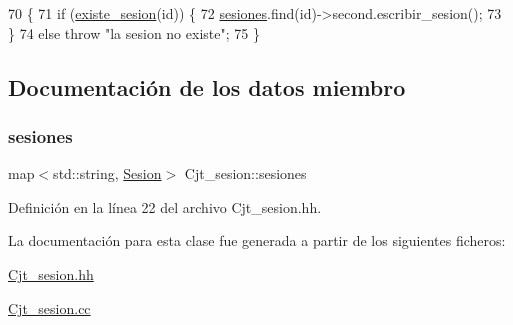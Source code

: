 \begin{DoxyCode}
70                                         \{
71     \textcolor{keywordflow}{if} (\mbox{\hyperlink{class_cjt__sesion_a405ed3806e378d1a415588e640584bbd}{existe\_sesion}}(\textcolor{keywordtype}{id})) \{
72       \mbox{\hyperlink{class_cjt__sesion_abac1c2ee3cccc598a8274c7da869aa9b}{sesiones}}.find(\textcolor{keywordtype}{id})->second.escribir\_sesion();
73     \}
74     \textcolor{keywordflow}{else} \textcolor{keywordflow}{throw} \textcolor{stringliteral}{"la sesion no existe"};
75 \}
\end{DoxyCode}


\subsection{Documentación de los datos miembro}
\mbox{\label{class_cjt__sesion_abac1c2ee3cccc598a8274c7da869aa9b}} 
\subsubsection{\texorpdfstring{sesiones}{sesiones}}
{\footnotesize\ttfamily map$<$std\+::string, \mbox{\hyperlink{class_sesion}{Sesion}}$>$ Cjt\+\_\+sesion\+::sesiones\hspace{0.3cm}{\ttfamily [private]}}



Definición en la línea 22 del archivo Cjt\+\_\+sesion.\+hh.



La documentación para esta clase fue generada a partir de los siguientes ficheros\+:\begin{DoxyCompactItemize}
\item 
\mbox{\hyperlink{_cjt__sesion_8hh}{Cjt\+\_\+sesion.\+hh}}\item 
\mbox{\hyperlink{_cjt__sesion_8cc}{Cjt\+\_\+sesion.\+cc}}\end{DoxyCompactItemize}
